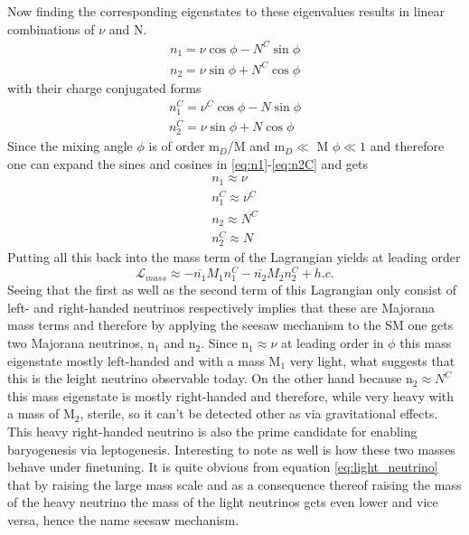 Now finding the corresponding eigenstates to these eigenvalues results in linear combinations of $\nu$ and N.
\begin{align}
	n_{1}=\nu\cos\phi-N^C\sin\phi
	\label{eq:n1}
	\\
	n_{2}=\nu\sin\phi+N^C\cos\phi
	\label{eq:n2}
\end{align}
with their charge conjugated forms
\begin{align}
n_{1}^C=\nu^C\cos\phi-N\sin\phi
\label{eq:n1C}
\\
n_{2}^C=\nu\sin\phi+N\cos\phi
\label{eq:n2C}
\end{align}
Since the mixing angle $\phi$ is of order m$_D$/M and m$_D\ll$ M $\phi\ll1$ and therefore one can expand the sines and cosines in \ref{eq:n1}-\ref{eq:n2C} and gets
\begin{align}
	n_{1}\approx\nu\\
	n_{1}^C\approx\nu^C\\
	n_{2}\approx N^C\\
	n_{2}^C\approx N
\end{align}
Putting all this back into the mass term of the Lagrangian yields at leading order
\begin{equation}
	\mathcal{L}_{mass}\approx-\overline{n_1}M_1n_1^C-\overline{n_2}M_2n_2^C+h.c.
\end{equation}
Seeing that the first as well as the second term of this Lagrangian only consist of left- and right-handed neutrinos respectively implies that these are Majorana mass terms and therefore by applying the seesaw mechanism to the SM one gets two Majorana neutrinos, n$_1$ and n$_2$. \newline
Since n$_{1}\approx\nu$ at leading order in $\phi$ this mass eigenstate mostly left-handed and with a mass M$_1$ very light, what suggests that this is the leight neutrino observable today.\newline
On the other hand because n$_{2}\approx N^C$ this mass eigenstate is mostly right-handed and therefore, while very heavy with a mass of M$_2$, sterile, so it can't be detected other as via gravitational effects. This heavy right-handed neutrino is also the prime candidate for enabling baryogenesis via leptogenesis. \newline
Interesting to note as well is how these two masses behave under finetuning. It is quite obvious from equation \ref{eq:light_neutrino} that by raising the large mass scale and as a consequence thereof raising the mass of the heavy neutrino the mass of the light neutrinos gets even lower and vice versa, hence the name seesaw mechanism. 
